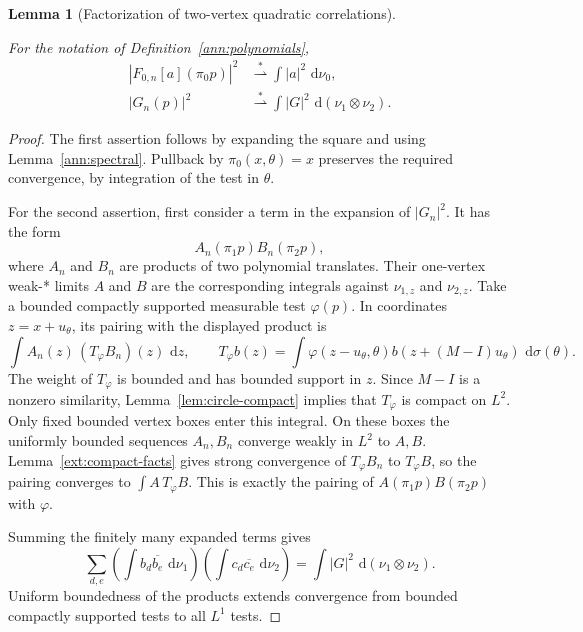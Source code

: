 \documentclass[11pt]{amsart}
\newcommand{\dd}{\,\mathrm d}
\newtheorem{lemma}[theorem]{Lemma}
\theoremstyle{definition}
\theoremstyle{remark}
\numberwithin{equation}{section}
\providecommand{\lean}[1]{}
\providecommand{\leanok}{}
\begin{document}
\begin{lemma}[Factorization of two-vertex quadratic correlations]
\label{ann:factor}
\lean{Auto.ann_factor_one,Auto.ann_factor_two}
\leanok
For the notation of Definition~\ref{ann:polynomials},
\begin{align*}
 |F_{0,n}[a](\pi_0p)|^2
 &\stackrel{*}{\rightharpoonup}\int|a|^2\,\dd\nu_0,\\
 |G_n(p)|^2
 &\stackrel{*}{\rightharpoonup}
 \int|G|^2\,\dd(\nu_1\otimes\nu_2).
\end{align*}
\end{lemma}
\begin{proof}
The first assertion follows by expanding the square and using
Lemma~\ref{ann:spectral}. Pullback by $\pi_0(x,\theta)=x$ preserves
the required convergence, by integration of the test in $\theta$.

For the second assertion, first consider a term in the expansion
of $|G_n|^2$. It has the form
\[
 A_n(\pi_1p)B_n(\pi_2p),
\]
where $A_n$ and $B_n$ are products of two polynomial translates.
Their one-vertex weak-* limits $A$ and $B$ are the corresponding
integrals against $\nu_{1,z}$ and $\nu_{2,z}$.
Take a bounded compactly supported measurable test $\varphi(p)$.
In coordinates $z=x+u_\theta$, its pairing with the displayed
product is
\[
 \int A_n(z)\,(T_\varphi B_n)(z)\,\dd z,
 \qquad
 T_\varphi b(z)=\int
 \varphi(z-u_\theta,\theta)b(z+(M-I)u_\theta)\,\dd\sigma(\theta).
\]
The weight of $T_\varphi$ is bounded and has bounded support in $z$.
Since $M-I$ is a nonzero similarity, Lemma~\ref{lem:circle-compact}
implies that $T_\varphi$ is compact on $L^2$.
Only fixed bounded vertex boxes enter this integral. On these
boxes the uniformly bounded sequences $A_n,B_n$ converge weakly
in $L^2$ to $A,B$. Lemma~\ref{ext:compact-facts} gives strong convergence of
$T_\varphi B_n$ to $T_\varphi B$, so the pairing converges to
$\int A\,T_\varphi B$. This is exactly the pairing of
$A(\pi_1p)B(\pi_2p)$ with $\varphi$.

Summing the finitely many expanded terms gives
\[
 \sum_{d,e}
 \left(\int b_d\overline{b_e}\,\dd\nu_1\right)
 \left(\int c_d\overline{c_e}\,\dd\nu_2\right)
 =\int|G|^2\,\dd(\nu_1\otimes\nu_2).
\]
Uniform boundedness of the products extends convergence from
bounded compactly supported tests to all $L^1$ tests.
\end{proof}
\end{document}
